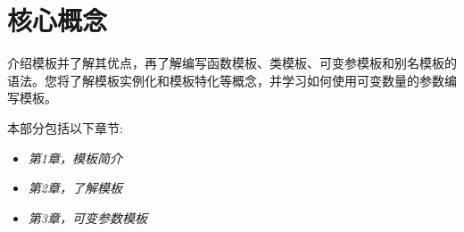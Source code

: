 \part{核心概念}
介绍模板并了解其优点，再了解编写函数模板、类模板、可变参模板和别名模板的语法。您将了解模板实例化和模板特化等概念，并学习如何使用可变数量的参数编写模板。

本部分包括以下章节:

\begin{itemize}
  \item \textit{第1章，模板简介}
  \item \textit{第2章，了解模板}
  \item \textit{第3章，可变参数模板}
\end{itemize}



